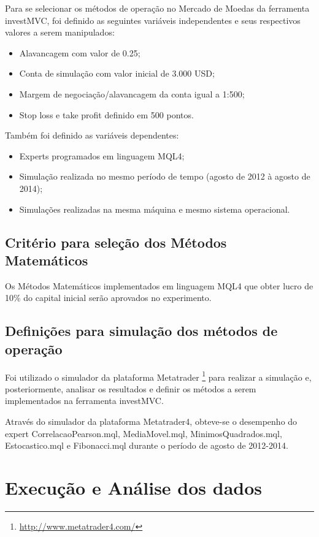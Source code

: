 Para se selecionar os métodos de operação no Mercado de Moedas da ferramenta investMVC, foi definido as seguintes variáveis independentes e seus respectivos valores a serem manipulados:

\begin{itemize}
\item Alavancagem com valor de 0.25;
\item Conta de simulação com valor inicial de 3.000 USD;
\item Margem de negociação/alavancagem da conta igual a 1:500;
\item Stop loss e take profit definido em 500 pontos.
\end{itemize}

Também foi definido as variáveis dependentes:

\begin{itemize}
\item Experts programados em linguagem MQL4;
\item Simulação realizada no mesmo período de tempo (agosto de 2012 à agosto de 2014);
\item Simulações realizadas na mesma máquina e mesmo sistema operacional.

\end{itemize}

\subsection{Critério para seleção dos Métodos Matemáticos}

Os Métodos Matemáticos implementados em linguagem MQL4 que obter lucro de 10\% do capital inicial serão aprovados no experimento.

\subsection{Definições para simulação dos métodos de operação}

Foi utilizado o simulador da plataforma Metatrader \footnote{\url{http://www.metatrader4.com/}} para realizar a simulação e, posteriormente, analisar os resultados e definir os métodos a serem implementados na ferramenta investMVC.

Através do simulador da plataforma Metatrader4, obteve-se o desempenho do expert CorrelacaoPearson.mql, MediaMovel.mql, MinimosQuadrados.mql, Estocastico.mql e Fibonacci.mql durante o período de agosto de 2012-2014.

\section{Execução e Análise dos dados}

